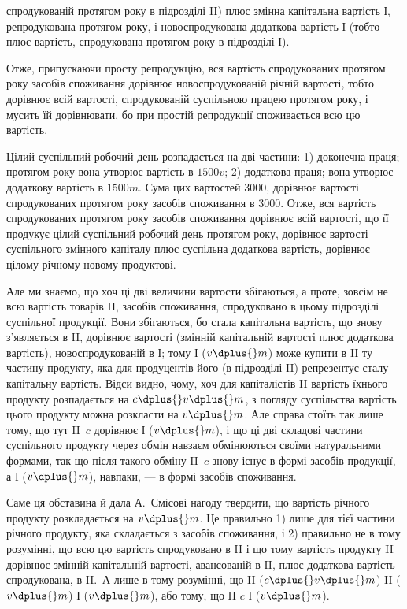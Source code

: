 \parcont{}  %
спродукованій протягом року в підрозділі II) плюс змінна капітальна
вартість І, репродукована протягом року, і новоспродукована додаткова
вартість І (тобто плюс вартість, спродукована протягом року в підрозділі
І).

Отже, припускаючи просту репродукцію, вся вартість спродукованих
протягом року засобів споживання дорівнює новоспродукованій річній
вартості, тобто дорівнює всій вартості, спродукованій суспільною працею
протягом року, і мусить їй дорівнювати, бо при простій репродукції
споживається всю цю вартість.

Цілий суспільний робочий день розпадається на дві частини: 1) доконечна
праця; протягом року вона утворює вартість в $1500 v$; 2) додаткова
праця; вона утворює додаткову вартість в $1500 m$. Сума цих
вартостей \deq{} 3000, дорівнює вартості спродукованих протягом року засобів
споживання в 3000. Отже, вся вартість спродукованих протягом
року засобів споживання дорівнює всій вартості, що її продукує цілий
суспільний робочий день протягом року, дорівнює вартості суспільного змінного
капіталу плюс суспільна додаткова вартість, дорівнює цілому річному
новому продуктові.

Але ми знаємо, що хоч ці дві величини вартости збігаються, а проте,
зовсім не всю вартість товарів II, засобів споживання, спродуковано
в цьому підрозділі суспільної продукції. Вони збігаються, бо стала
капітальна вартість, що знову з’являється в II, дорівнює вартості (змінній
капітальній вартості плюс додаткова вартість), новоспродукованій
в І; тому І ($v \dplus{} m$) може купити в II ту частину продукту, яка для продуцентів
його (в підрозділі II) репрезентує сталу капітальну вартість. Відси
видно, чому, хоч для капіталістів II вартість їхнього продукту розпадається
на $c \dplus{} v \dplus{} m$, з погляду суспільства вартість цього продукту
можна розкласти на $v \dplus{} m$. Але справа стоїть так лише тому, що тут
II~$c$ дорівнює І ($v \dplus{} m$), і що ці дві складові частини суспільного продукту
через обмін навзаєм обмінюються своїми натуральними формами,
так що після такого обміну II~$c$ знову існує в формі засобів продукції,
а І ($v \dplus{} m$), навпаки, — в формі засобів споживання.

Саме ця обставина й дала А.~Смісові нагоду твердити, що вартість
річного продукту розкладається на $v \dplus{} m$. Це правильно 1) лише для
тієї частини річного продукту, яка складається з засобів споживання, і
2) правильно не в тому розумінні, що всю цю вартість спродуковано в II і
що тому вартість продукту II дорівнює змінній капітальній вартості, авансованій
в II, плюс додаткова вартість спродукована, в II.~А лише в тому
розумінні, що II ($c \dplus{} v \dplus{} m$) \deq{} II ($v \dplus{} m$) \dplus{} І ($v \dplus{} m$), або тому, що
II $c$ \deq{} І ($v \dplus{} m$).

